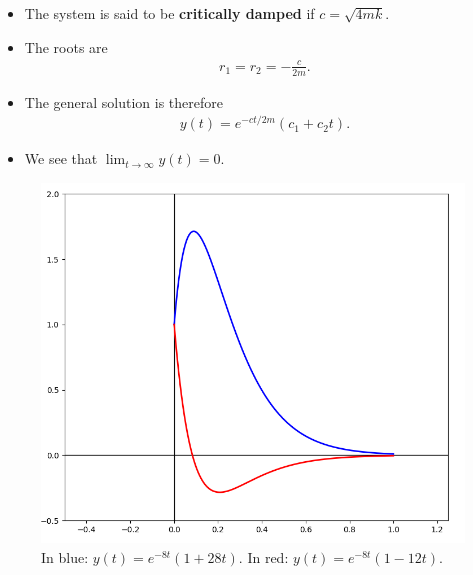 \documentclass[12pt,a4paper]{article}
\newcommand{\ra}{\rightarrow}
\begin{document}
	\begin{itemize}
	\item The system is said to be \textbf{critically damped} if $c = \sqrt{4mk}$.
	\item The roots are
		\begin{align*}
		r_1 = r_2 = -\frac{c}{2m} .
		\end{align*}
	\item The general solution is therefore
		\begin{align*}
		y(t) = e^{-ct/2m} (c_1 + c_2 t) .
		\end{align*}
	\item We see that $\lim_{t \ra \infty} y(t) = 0$.
	\end{itemize}
	
	\begin{figure}[h]
	\centering
	\includegraphics[scale=0.5]{fig6.png}
	\caption{In blue: $y(t) = e^{-8t}(1 + 28t)$. In red: $y(t) = e^{-8t} (1 - 12t)$.}
	\end{figure}
\end{document}
